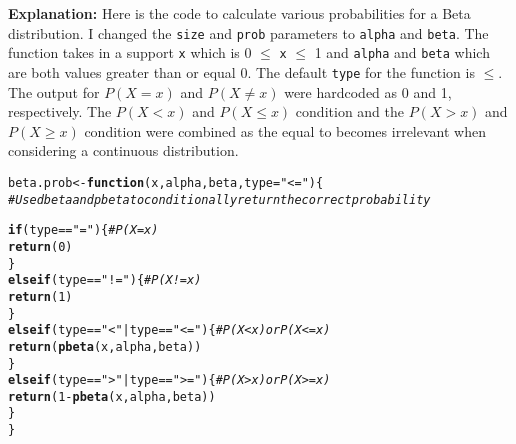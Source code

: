 \documentclass{article}\usepackage[]{graphicx}\usepackage[]{xcolor}
\makeatletter
\newcommand{\hlnum}[1]{\textcolor[rgb]{0.686,0.059,0.569}{#1}}%
\newcommand{\hlsng}[1]{\textcolor[rgb]{0.192,0.494,0.8}{#1}}%
\newcommand{\hlcom}[1]{\textcolor[rgb]{0.678,0.584,0.686}{\textit{#1}}}%
\newcommand{\hlopt}[1]{\textcolor[rgb]{0,0,0}{#1}}%
\newcommand{\hldef}[1]{\textcolor[rgb]{0.345,0.345,0.345}{#1}}%
\newcommand{\hlkwa}[1]{\textcolor[rgb]{0.161,0.373,0.58}{\textbf{#1}}}%
\newcommand{\hlkwb}[1]{\textcolor[rgb]{0.69,0.353,0.396}{#1}}%
\newcommand{\hlkwc}[1]{\textcolor[rgb]{0.333,0.667,0.333}{#1}}%
\newcommand{\hlkwd}[1]{\textcolor[rgb]{0.737,0.353,0.396}{\textbf{#1}}}%
\newenvironment{kframe}{%
 \def\at@end@of@kframe{}%
 \ifinner\ifhmode%
  \def\at@end@of@kframe{\end{minipage}}%
  \begin{minipage}{\columnwidth}%
 \fi\fi%
 \def\FrameCommand##1{\hskip\@totalleftmargin \hskip-\fboxsep
 \colorbox{shadecolor}{##1}\hskip-\fboxsep
     \hskip-\linewidth \hskip-\@totalleftmargin \hskip\columnwidth}%
 \MakeFramed {\advance\hsize-\width
   \@totalleftmargin\z@ \linewidth\hsize
   \@setminipage}}%
 {\par\unskip\endMakeFramed%
 \at@end@of@kframe}
\newenvironment{knitrout}{}{} %
\makeatother
\begin{document}
\begin{enumerate}
\textbf{Explanation:} Here is the code to calculate various probabilities for a Beta distribution. I changed the \texttt{size} and \texttt{prob} parameters to \texttt{alpha} and \texttt{beta}. The function takes in a support \texttt{x} which is 0 $\leq$ \texttt{x} $\leq$ 1 and \texttt{alpha} and \texttt{beta} which are both values greater than or equal 0. The default \texttt{type} for the function is $\leq$. The output for $P(X=x)$ and $P(X \neq x)$ were hardcoded as 0 and 1, respectively. The $P(X<x)$ and $P(X \leq x)$ condition and the $P(X > x)$ and $P(X \geq x)$ condition were combined as the equal to becomes irrelevant when considering a continuous distribution.

\begin{knitrout}\scriptsize
{}\color{fgcolor}\begin{kframe}
\begin{alltt}
\hldef{beta.prob} \hlkwb{<-} \hlkwa{function}\hldef{(}\hlkwc{x}\hldef{,} \hlkwc{alpha}\hldef{,} \hlkwc{beta}\hldef{,} \hlkwc{type}\hldef{=}\hlsng{"<="}\hldef{)\{}
  \hlcom{# Use dbeta and pbeta to conditionally return the correct probability}

  \hlkwa{if} \hldef{(type} \hlopt{==} \hlsng{"="}\hldef{)\{} \hlcom{#P(X = x)}
    \hlkwd{return}\hldef{(}\hlnum{0}\hldef{)}
  \hldef{\}}
  \hlkwa{else if} \hldef{(type} \hlopt{==} \hlsng{"!="}\hldef{)\{} \hlcom{#P(X != x)}
    \hlkwd{return}\hldef{(}\hlnum{1}\hldef{)}
  \hldef{\}}
  \hlkwa{else if}\hldef{(type} \hlopt{==} \hlsng{"<"} \hlopt{|} \hldef{type} \hlopt{==} \hlsng{"<="}\hldef{)\{} \hlcom{#P(X < x) or P(X <= x)}
    \hlkwd{return}\hldef{(}\hlkwd{pbeta}\hldef{(x, alpha, beta))}
  \hldef{\}}
  \hlkwa{else if} \hldef{(type} \hlopt{==} \hlsng{">"} \hlopt{|} \hldef{type} \hlopt{==} \hlsng{">="}\hldef{)\{} \hlcom{#P(X > x) or P(X >= x)}
    \hlkwd{return}\hldef{(}\hlnum{1} \hlopt{-} \hlkwd{pbeta}\hldef{(x, alpha, beta))}
  \hldef{\}}
\hldef{\}}
\end{alltt}
\end{kframe}
\end{knitrout}

\end{enumerate}

\end{document}
